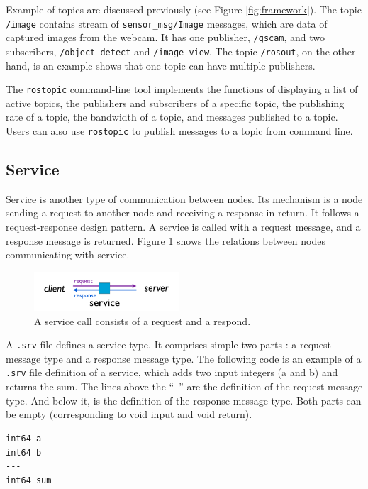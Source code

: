 \documentclass[a4paper, 10pt, conference]{ieeeconf}       %
\begin{document}
Example of topics are discussed previously (see Figure \ref{fig:framework}). The topic \texttt{/image} contains stream of \texttt{sensor\_msg/Image} messages, which are data of captured images from the webcam. It has one publisher, \texttt{/gscam}, and two subscribers, \texttt{/object\_detect} and \texttt{/image\_view}. The topic \texttt{/rosout}, on the other hand, is an example shows that one topic can have multiple publishers.

The \texttt{rostopic} command-line tool implements the functions of displaying a list of active topics, the publishers and subscribers of a specific topic, the publishing rate of a topic, the bandwidth of a topic, and messages published to a topic. Users can also use \texttt{rostopic} to publish messages to a topic from command line.

\subsection{Service}

Service is another type of communication between nodes. Its mechanism is a node sending a request to another node and receiving a response in return. It follows a request-response design pattern. A service is called with a request message, and a response message is returned. Figure \ref{fig:service} shows the relations between nodes communicating with service.

\begin{figure}[htpb]
  \centering
  \includegraphics[width=0.48\textwidth]{service}
  \caption{A service call consists of a request and a respond.}
  \label{fig:service}
\end{figure}

A \texttt{.srv} file defines a service type. It comprises simple two parts : a request message type and a response message type. The following code is an example of a \texttt{.srv} file definition of a service, which adds two input integers (a and b) and returns the sum. The lines above the ``\texttt{---}'' are the definition of the request message type. And below it, is the definition of the response message type. Both parts can be empty (corresponding to void input and void return).

\vspace{8pt}
\begin{Verbatim}[frame=single]
int64 a
int64 b
---
int64 sum
\end{Verbatim}
\end{document}
